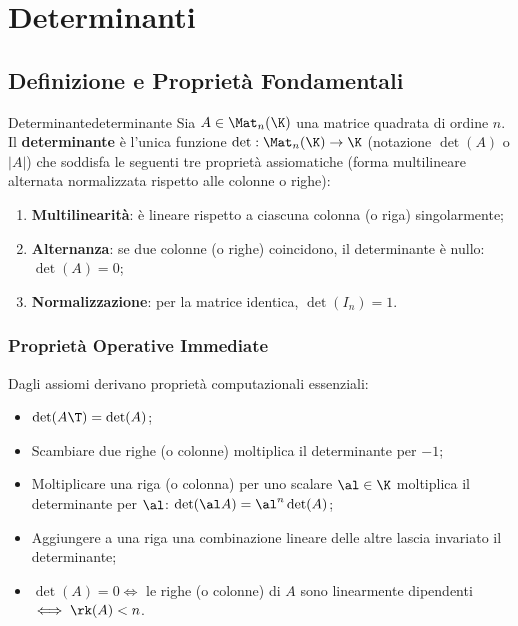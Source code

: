 
\chapter{Determinanti}
\label{chap:determinanti}

\section{Definizione e Proprietà Fondamentali}

\begin{definizione}{Determinante}{determinante}
Sia $A \in \Mat_n(\K)$ una matrice quadrata di ordine $n$. Il \textbf{determinante} è l'unica funzione $\det: \Mat_n(\K) \to \K$ (notazione $\det(A)$ o $|A|$) che soddisfa le seguenti tre proprietà assiomatiche (forma multilineare alternata normalizzata rispetto alle colonne o righe):
\begin{enumerate}[label=(\roman*)]
    \item \textbf{Multilinearità}: è lineare rispetto a ciascuna colonna (o riga) singolarmente;
    \item \textbf{Alternanza}: se due colonne (o righe) coincidono, il determinante è nullo: $\det(A) = 0$;
    \item \textbf{Normalizzazione}: per la matrice identica, $\det(I_n) = 1$.
\end{enumerate}
\end{definizione}

\subsection{Proprietà Operative Immediate}
Dagli assiomi derivano proprietà computazionali essenziali:
\begin{itemize}
    \item $\det(A\T) = \det(A)$;
    \item Scambiare due righe (o colonne) moltiplica il determinante per $-1$;
    \item Moltiplicare una riga (o colonna) per uno scalare $\al \in \K$ moltiplica il determinante per $\al$: $\det(\al A) = \al^n \det(A)$;
    \item Aggiungere a una riga una combinazione lineare delle altre lascia invariato il determinante;
    \item $\det(A) = 0 \iff$ le righe (o colonne) di $A$ sono linearmente dipendenti $\iff \rk(A) < n$.
\end{itemize}

